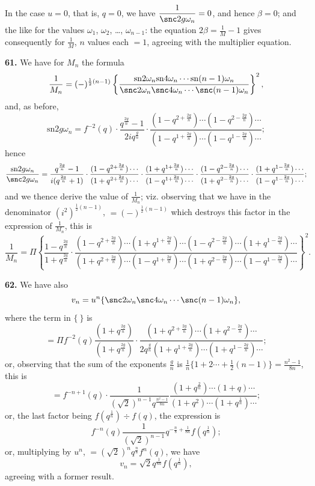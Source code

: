 \documentclass[11pt,a4paper]{book}
\providecommand{\sn}{\mathrm{sn}}
\begin{document}
In the case $u = 0$, that is, $q = 0$, we have $\dfrac{1}{\snc 2g\omega_n} = 0$, and hence $\beta = 0$; and the like for the values $\omega_1$, $\omega_2$, \ldots, $\omega_{n-1}$: the equation $2\beta = \frac{1}{M} - 1$ gives consequently for $\frac{1}{M}$, $n$ values each $= 1$, agreeing with the multiplier equation.

\textbf{61.} We have for $M_n$ the formula
\[
\frac{1}{M_n} = (-)^{\frac{1}{2}(n-1)}
\left\{\frac{\sn 2\omega_n \sn 4\omega_n \cdots \sn (n-1)\omega_n}
{\snc 2\omega_n \snc 4\omega_n \cdots \snc (n-1)\omega_n}\right\}^2,
\]
and, as before,
\[
\sn 2g\omega_n = f^{-2}(q) \cdot
\frac{q^{\frac{2g}{n}} - 1}{2iq^{\frac{g}{n}}} \cdot
\frac{(1 - q^{2 + \frac{2g}{n}}) \cdots (1 - q^{2 - \frac{2g}{n}}) \cdots}
{(1 - q^{1 + \frac{2g}{n}}) \cdots (1 - q^{1 - \frac{2g}{n}}) \cdots};
\]
hence
\[
\frac{\sn 2g\omega_n}{\snc 2g\omega_n}
= \frac{q^{\frac{2g}{n}} - 1}{i(q^{\frac{2g}{n}} + 1)} \cdot
\frac{(1 - q^{2 + \frac{2g}{n}}) \cdots}{(1 + q^{2 + \frac{2g}{n}}) \cdots} \cdot
\frac{(1 + q^{1 + \frac{2g}{n}}) \cdots}{(1 - q^{1 + \frac{2g}{n}}) \cdots} \cdot
\frac{(1 - q^{2 - \frac{2g}{n}}) \cdots}{(1 + q^{2 - \frac{2g}{n}}) \cdots} \cdot
\frac{(1 + q^{1 - \frac{2g}{n}}) \cdots}{(1 - q^{1 - \frac{2g}{n}}) \cdots};
\]
and we thence derive the value of $\frac{1}{M_n}$; viz. observing that we have in the denominator $(i^2)^{\frac{1}{2}(n-1)}$, $= (-)^{\frac{1}{2}(n-1)}$ which destroys this factor in the expression of $\frac{1}{M_n}$, this is
\[
\frac{1}{M_n} = \Pi \left\{
\frac{1 - q^{\frac{2g}{n}}}{1 + q^{\frac{2g}{n}}} \cdot
\frac{(1 - q^{2 + \frac{2g}{n}}) \cdots (1 + q^{1 + \frac{2g}{n}}) \cdots
(1 - q^{2 - \frac{2g}{n}}) \cdots (1 + q^{1 - \frac{2g}{n}}) \cdots}
{(1 + q^{2 + \frac{2g}{n}}) \cdots (1 - q^{1 + \frac{2g}{n}}) \cdots
(1 + q^{2 - \frac{2g}{n}}) \cdots (1 - q^{1 - \frac{2g}{n}}) \cdots}
\right\}^2.
\]




\textbf{62.} We have also
\[
v_n = u^n\{\snc 2\omega_n \snc 4\omega_n \cdots \snc (n-1)\omega_n\},
\]
where the term in $\{~\}$ is
\[
= \Pi f^{-2}(q) \frac{(1 + q^{\frac{2g}{n}})}{(1 + q^{\frac{2g}{n}})} \cdot
\frac{(1 + q^{2 + \frac{2g}{n}}) \cdots (1 + q^{2 - \frac{2g}{n}}) \cdots}
{2q^{\frac{g}{n}}(1 + q^{1 + \frac{2g}{n}}) \cdots (1 + q^{1 - \frac{2g}{n}}) \cdots};
\]
or, observing that the sum of the exponents $\frac{g}{n}$ is $\frac{1}{n}\{1 + 2 \cdots + \frac{1}{2}(n-1)\} = \frac{n^2 - 1}{8n}$, this is
\[
= f^{-n+1}(q) \cdot \frac{1}{(\sqrt{2})^{n-1} q^{\frac{n^2 - 1}{8n}}}
\frac{(1 + q^{\frac{2}{n}}) \cdots (1 + q) \cdots}
{(1 + q^2) \cdots (1 + q^{\frac{1}{n}}) \cdots};
\]
or, the last factor being $f(q^{\frac{1}{n}}) \div f(q)$, the expression is
\[
f^{-n}(q) \frac{1}{(\sqrt{2})^{n-1}} q^{-\frac{n}{8} + \frac{1}{8n}} f(q^{\frac{1}{n}});
\]
or, multiplying by $u^n$, $= (\sqrt{2})^n q^{\frac{n}{8}} f^n(q)$, we have
\[
v_n = \sqrt{2} q^{\frac{1}{8n}} f(q^{\frac{1}{n}}),
\]
agreeing with a former result.
\end{document}
